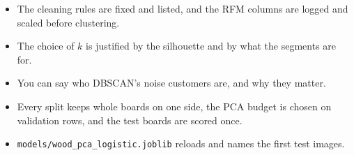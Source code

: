 \begin{labchecklists}
\begin{verification}
\begin{itemize}
  \item The cleaning rules are fixed and listed, and the RFM columns are logged and scaled before clustering.
  \item The choice of $k$ is justified by the silhouette and by what the segments are for.
  \item You can say who DBSCAN's noise customers are, and why they matter.
  \item Every split keeps whole boards on one side, the PCA budget is chosen on validation rows, and the test boards are scored once.
  \item \texttt{models/wood\_pca\_logistic.joblib} reloads and names the first test images.
\end{itemize}
\end{verification}
\end{labchecklists}
